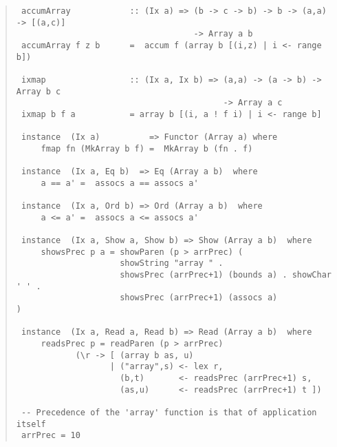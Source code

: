 \begin{quote}
{\begin{verbatim}
 accumArray            :: (Ix a) => (b -> c -> b) -> b -> (a,a) -> [(a,c)]
                                    -> Array a b
 accumArray f z b      =  accum f (array b [(i,z) | i <- range b])
 
 ixmap                 :: (Ix a, Ix b) => (a,a) -> (a -> b) -> Array b c
                                          -> Array a c
 ixmap b f a           = array b [(i, a ! f i) | i <- range b]
 
 instance  (Ix a)          => Functor (Array a) where
     fmap fn (MkArray b f) =  MkArray b (fn . f) 
 
 instance  (Ix a, Eq b)  => Eq (Array a b)  where
     a == a' =  assocs a == assocs a'
 
 instance  (Ix a, Ord b) => Ord (Array a b)  where
     a <= a' =  assocs a <= assocs a'
 
 instance  (Ix a, Show a, Show b) => Show (Array a b)  where
     showsPrec p a = showParen (p > arrPrec) (
                     showString "array " .
                     showsPrec (arrPrec+1) (bounds a) . showChar ' ' .
                     showsPrec (arrPrec+1) (assocs a)                  )
 
 instance  (Ix a, Read a, Read b) => Read (Array a b)  where
     readsPrec p = readParen (p > arrPrec)
            (\r -> [ (array b as, u) 
                   | ("array",s) <- lex r,
                     (b,t)       <- readsPrec (arrPrec+1) s,
                     (as,u)      <- readsPrec (arrPrec+1) t ])
 
 -- Precedence of the 'array' function is that of application itself
 arrPrec = 10
\end{verbatim}}
\end{quote}
